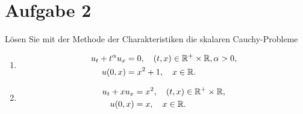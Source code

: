\documentclass{exercise}
\begin{document}
    \section*{Aufgabe 2}
    
    \begin{problem}
        Lösen Sie mit der Methode der Charakteristiken die skalaren Cauchy-Probleme
        \begin{enumerate}
            \item
            \begin{align*}
                u_t + t^\alpha u_x &= 0, \quad \parentheses*{t, x} \in \R^+ \times \R, \alpha > 0,\\
                u\parentheses*{0, x} &= x^2 + 1, \quad x \in \R.
            \end{align*}
            \item
            \begin{align*}
                u_t + xu_x &= x^2, \quad \parentheses*{t, x} \in \R^+ \times \R,\\
                u\parentheses*{0, x} &= x, \quad x \in \R.
            \end{align*}
        \end{enumerate}
    \end{problem}
    
\end{document}
